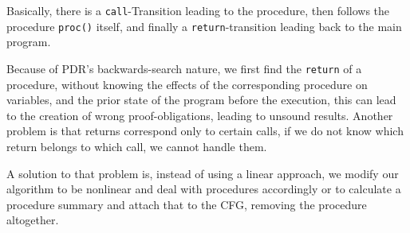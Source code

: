 \documentclass[11pt, a4paper, BCOR=10mm, ngerman]{scrbook}
\begin{document}
Basically, there is a \texttt{call}-Transition leading to the procedure, then follows the procedure \texttt{proc()} itself, and finally a \texttt{return}-transition leading back to the main program. \par
Because of PDR's backwards-search nature, we first find the \texttt{return} of a procedure, without knowing the effects of the corresponding procedure on variables, and the prior state of the program before the execution, this can lead to the creation of wrong proof-obligations, leading to unsound results. Another problem is that returns correspond only to certain calls, if we do not know which return belongs to which call, we cannot handle them. \par

A solution to that problem is, instead of using a linear approach, we modify our algorithm to be nonlinear and deal with procedures accordingly \cite{DBLP:conf/sat/HoderB12} or to calculate a procedure summary and attach that to the CFG, removing the procedure altogether.
%

%
%
\end{document}
